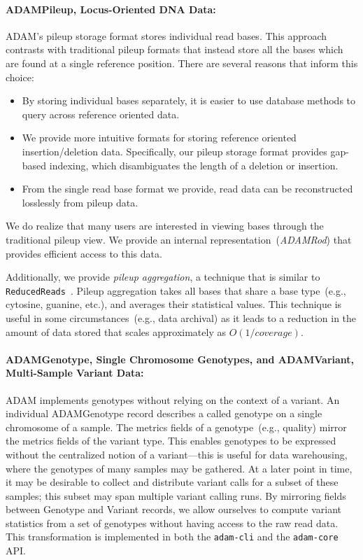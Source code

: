 \documentclass{bioinfo}
\begin{document}
\paragraph{ADAMPileup, Locus-Oriented DNA Data:}
\label{sec:adampileup}

ADAM's pileup storage format stores individual read bases. This approach contrasts with traditional pileup formats that instead store all the bases which are found at a single
reference position. There are several reasons that inform this choice:

\begin{itemize}
\item By storing individual bases separately, it is easier to use database methods to query across reference oriented data.
\item We provide more intuitive formats for storing reference oriented insertion/deletion data. Specifically, our pileup storage format provides gap-based indexing, which
disambiguates the length of a deletion or insertion.
\item From the single read base format we provide, read data can be reconstructed losslessly from pileup data.
\end{itemize}

We do realize that many users are interested in viewing bases through the traditional pileup view. We provide an internal representation~(\textit{ADAMRod}) that provides
efficient access to this data.

Additionally, we provide \emph{pileup aggregation}, a technique that is similar to \texttt{ReducedReads}~\citep[see][]{mckenna10}. Pileup aggregation takes all bases that
share a base type~(e.g., cytosine, guanine, etc.), and averages their statistical values. This technique is useful in some circumstances~(e.g., data archival) as it leads to a
reduction in the amount of data stored that scales approximately as $O(1/coverage)$.

\paragraph{ADAMGenotype, Single Chromosome Genotypes, and ADAMVariant, Multi-Sample Variant Data:}
\label{sec:adamvariant}

ADAM implements genotypes without relying on the context of a variant. An individual ADAMGenotype record describes a called genotype on a single chromosome of a
sample. The metrics fields of a genotype~(e.g., quality) mirror the metrics fields of the variant type. This enables genotypes to be expressed without the centralized notion
of a variant---this is useful for data warehousing, where the genotypes of many samples may be gathered. At a later point in time, it may be desirable to collect and distribute
variant calls for a subset of these samples; this subset may span multiple variant calling runs. By mirroring fields between Genotype and Variant records, we allow ourselves
to compute variant statistics from a set of genotypes without having access to the raw read data. This transformation is implemented in both the \texttt{adam-cli} and the
\texttt{adam-core} API.
\end{document}
